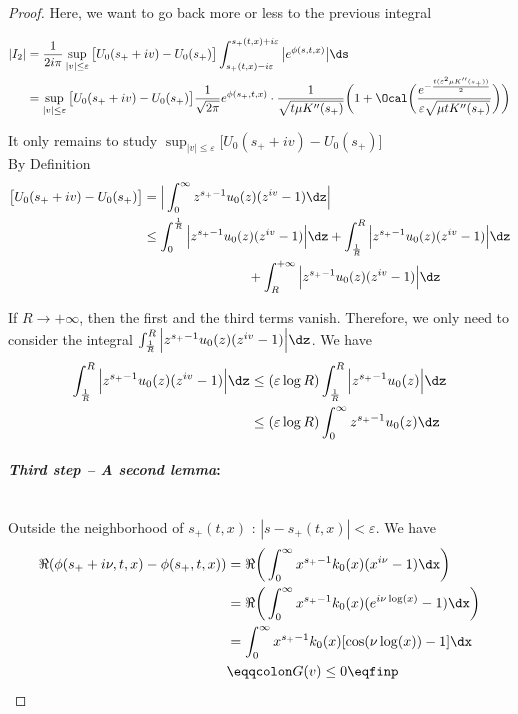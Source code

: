 \begin{proof}
Here, we want to go back more or less to the previous integral

    \begin{align*}
         |I_2| 
         &= 
         \frac{1}{2i \pi} \sup_{|v| \leq \varepsilon} \big[U_0(s_+ + iv) -  U_0(s_+) \big] \int_{s_+(t,x) - i\varepsilon}^{s_+(t,x) + i\varepsilon} \big| e^{\phi(s,t,x)} \big| \ds \\
         &=
         \sup_{|v| \leq \varepsilon} \big[U_0(s_+ + iv) -  U_0(s_+) \big] \frac{1}{\sqrt{2\pi}} e^{\phi(s_+, t, x)} \cdot \frac{1}{\sqrt{t \mu K''(s_+)}} \bigg( 
    1 + \Ocal\bigg(\frac{e^{-\frac{t(\varepsilon^2 \mu K''(s_+))}{2}} }{\varepsilon \sqrt{\mu tK''(s_+)}}\bigg) \bigg)
    \end{align*}
    
It only remains to study $  \sup_{|v| \leq \varepsilon} \big[U_0(s_+ + iv) -  U_0(s_+) \big]$ \\

By Definition
\begin{align*}
    \big[U_0(s_+ + iv) -  U_0(s_+) \big]
    &= \Big| \int_0^\infty  z^{s_+ - 1}u_0(z) (z^{iv} - 1) \dz \Big| \\
    &\leq \int_0^{\frac{1}{R}} \Big|  z^{s_+ - 1}u_0(z) (z^{iv} - 1) \Big| \dz
        + \int_{\frac{1}{R}}^R \Big|  z^{s_+ - 1}u_0(z) (z^{iv} - 1) \Big| \dz \\
        &\qquad \qquad \qquad \qquad
        + \int_R^{+\infty} \Big|  z^{s_+ - 1}u_0(z) (z^{iv} - 1) \Big| \dz \\
\end{align*}

If $R \to + \infty$, then the first and the third terms vanish. Therefore, we only need to consider the integral $ \int_{\frac{1}{R}}^R \Big|  z^{s_+ - 1}u_0(z) (z^{iv} - 1) \Big| \dz$. We have
    \begin{align*}
         \int_{\frac{1}{R}}^R \Big|  z^{s_+ - 1}u_0(z) (z^{iv} - 1) \Big| \dz 
         &\leq 
          (\varepsilon \log R)\int_{\frac{1}{R}}^R \Big|  z^{s_+ - 1}u_0(z) \Big| \dz \\
         &\leq 
          (\varepsilon \log R)\int_{0}^{\infty} z^{s_+ - 1}u_0(z)  \dz \\
    \end{align*}

\medskip
\paragraph{\textit{Third step -- A second lemma}:}\mbox{}\\
Outside the neighborhood of $s_+(t,x)$ : $|s - s_+(t,x)| < \varepsilon$. We have
\begin{align*}
    \Re(\phi(s_+ + i \nu, t, x) - \phi(s_+, t, x)) 
    &=
    \Re \bigg( \int_0^\infty x^{s_+ - 1}k_0(x) (x^{i\nu} - 1) \dx \bigg) \\
    &=
    \Re \bigg( \int_0^\infty x^{s_+ - 1}k_0(x) (e^{i\nu \log(x)}- 1) \dx \bigg) \\ 
    &= 
    \int_0^\infty x^{s_+ - 1}k_0(x) [\cos(\nu \log(x))- 1] \dx  \\
    &\eqqcolon G(v) \leq 0
    \eqfinp
\end{align*}


\end{proof}
